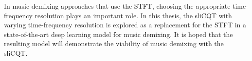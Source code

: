 \documentclass[letter,12pt]{article}
\begin{document}
In music demixing approaches that use the STFT, choosing the appropriate time-frequency resolution plays an important role. In this thesis, the sliCQT with varying time-frequency resolution is explored as a replacement for the STFT in a state-of-the-art deep learning model for music demixing. It is hoped that the resulting model will demonstrate the viability of music demixing with the sliCQT.

\vfill
\clearpage %


\begingroup
{}
\setlength\bibitemsep{0.065em}
\printbibheading[title={References},heading=bibnumbered]
\printbibliography[heading=none]
\endgroup

\vfill
\clearpage %
\end{document}
